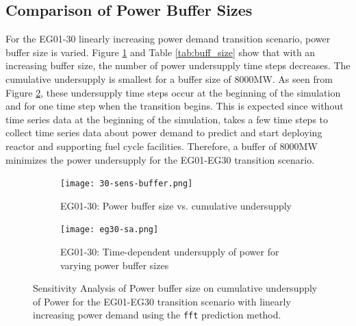 \subsection{Comparison of Power Buffer Sizes}
For the EG01-30 linearly increasing power demand 
transition scenario, power buffer size is varied. 
Figure \ref{fig:eg30-bufplot} and Table \ref{tab:buff_size} 
show that with an increasing buffer size, the number of 
power undersupply time steps decreases. 
The cumulative undersupply is smallest for a buffer 
size of 8000MW.  
As seen from Figure \ref{fig:eg30-dotplot}, these undersupply time 
steps occur at the beginning of the simulation and for one 
time step when the transition begins. 
This is expected since without time series data 
at the beginning of the simulation, \deploy takes a few 
time steps to collect time series data about power demand 
to predict and start deploying reactor and supporting 
fuel cycle facilities. 
Therefore, a buffer of 8000MW minimizes 
the power undersupply for the EG01-EG30 transition scenario.

\begin{figure}[]
	\centering
	\begin{subfigure}[t]{\textwidth}
		\centering
		\texttt{[image: 30-sens-buffer.png]} 
		\caption{EG01-30: Power buffer size vs. cumulative undersupply}
		\label{fig:eg30-bufplot}
	\end{subfigure}
	\begin{subfigure}[t]{\textwidth}
		\centering
		\texttt{[image: eg30-sa.png]} 
		\caption{EG01-30: Time-dependent undersupply of power for varying power buffer sizes}
		\label{fig:eg30-dotplot}
	\end{subfigure}
	\hfill
	\caption{Sensitivity Analysis of Power buffer size on cumulative 
	undersupply of Power for the EG01-EG30 transition scenario 
	with linearly increasing power demand using the \texttt{fft} prediction method.}
	\label{fig:sabuffer}
\end{figure}

